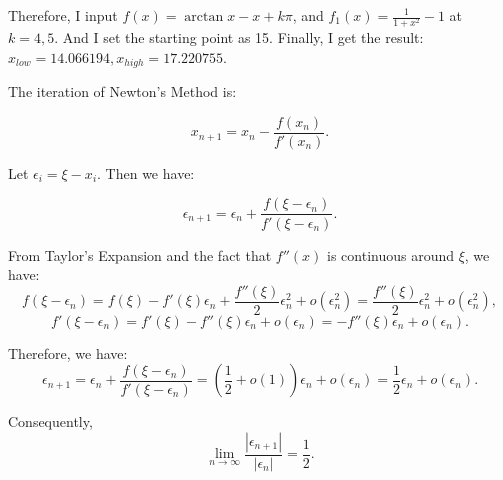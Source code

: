 \documentclass[
  course = {{16-811 Math Fundamentals for Robotics}},
  quartile = {{1}},
  assignment = 2,
  name = {{Kangle Deng}},
  email = {{kangled@andrew.cmu.edu}},
  firstexercise = 1
]{aga-homework}
\begin{document}
Therefore, I input $f(x) = \arctan x - x + k\pi$, and $f_1(x) = \frac{1}{1+x^2}-1$ at $k = 4, 5$. And I set the starting point as 15. Finally, I get the result: $x_{low} = 14.066194, x_{high} = 17.220755$.



\exercise
\subexercise
The iteration of Newton's Method is:

\begin{equation*}
    x_{n+1} = x_n - \frac{f(x_n)}{f'(x_n)}.
\end{equation*}

Let $\epsilon_i = \xi - x_i$. Then we have:

\begin{equation*}
    \epsilon_{n+1} = \epsilon_n + \frac{f(\xi - \epsilon_n)}{f'(\xi - \epsilon_n)}.
\end{equation*}

From Taylor's Expansion and the fact that $f''(x)$ is continuous around $\xi$, we have:
\begin{equation*}
    f(\xi - \epsilon_n) = f(\xi) - f'(\xi)\epsilon_n + \frac{f''(\xi)}{2}\epsilon_n^2 + o(\epsilon_n^2) = \frac{f''(\xi)}{2}\epsilon_n^2 + o(\epsilon_n^2),
\end{equation*}
\begin{equation*}
    f'(\xi - \epsilon_n) = f'(\xi) - f''(\xi)\epsilon_n + o(\epsilon_n) = - f''(\xi)\epsilon_n + o(\epsilon_n).
\end{equation*}

Therefore, we have:
\begin{equation*}
    \epsilon_{n+1} = \epsilon_n + \frac{f(\xi - \epsilon_n)}{f'(\xi - \epsilon_n)} = (\frac{1}{2} + o(1))\epsilon_n + o(\epsilon_n) = \frac{1}{2}\epsilon_n + o(\epsilon_n).
\end{equation*}

Consequently,
\begin{equation*}
    \lim \limits_{n \rightarrow \infty} \frac{|\epsilon_{n+1}|}{|\epsilon_n|} = \frac{1}{2}.
\end{equation*}
\end{document}
